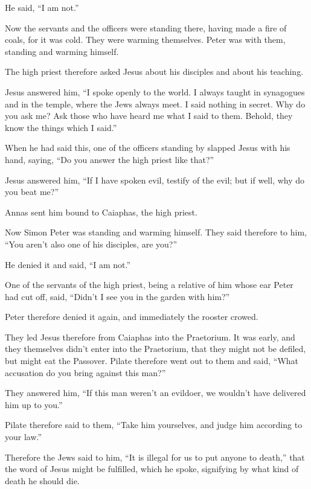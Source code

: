 He said, ``I am not.''

 Now the servants and the officers were standing there,
having made a fire of coals, for it was cold. They were warming
themselves. Peter was with them, standing and warming himself.

 The high priest therefore asked Jesus about his disciples
and about his teaching.

 Jesus answered him, ``I spoke openly to the world. I
always taught in synagogues and in the temple, where the Jews always
meet. I said nothing in secret.  Why do you ask me? Ask
those who have heard me what I said to them. Behold, they know the
things which I said.''

 When he had said this, one of the officers standing by
slapped Jesus with his hand, saying, ``Do you answer the high priest
like that?''

 Jesus answered him, ``If I have spoken evil, testify of
the evil; but if well, why do you beat me?''

 Annas sent him bound to Caiaphas, the high priest.

 Now Simon Peter was standing and warming himself. They
said therefore to him, ``You aren't also one of his disciples, are
you?''

He denied it and said, ``I am not.''

 One of the servants of the high priest, being a relative
of him whose ear Peter had cut off, said, ``Didn't I see you in the
garden with him?''

 Peter therefore denied it again, and immediately the
rooster crowed.

 They led Jesus therefore from Caiaphas into the
Praetorium. It was early, and they themselves didn't enter into the
Praetorium, that they might not be defiled, but might eat the Passover.
 Pilate therefore went out to them and said, ``What
accusation do you bring against this man?''

 They answered him, ``If this man weren't an evildoer, we
wouldn't have delivered him up to you.''

 Pilate therefore said to them, ``Take him yourselves, and
judge him according to your law.''

Therefore the Jews said to him, ``It is illegal for us to put anyone to
death,''  that the word of Jesus might be fulfilled, which
he spoke, signifying by what kind of death he should die.

